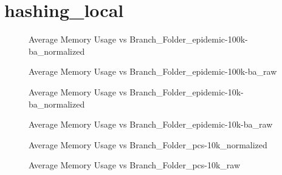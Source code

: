 \section{hashing\_local}
\begin{figure}[H]
\centering

\caption{Average Memory Usage vs Branch\_Folder\_epidemic-100k-ba\_normalized}
\end{figure}
\vspace{1cm}
\begin{figure}[H]
\centering

\caption{Average Memory Usage vs Branch\_Folder\_epidemic-100k-ba\_raw}
\end{figure}
\vspace{1cm}
\newpage
\begin{figure}[H]
\centering

\caption{Average Memory Usage vs Branch\_Folder\_epidemic-10k-ba\_normalized}
\end{figure}
\vspace{1cm}
\begin{figure}[H]
\centering

\caption{Average Memory Usage vs Branch\_Folder\_epidemic-10k-ba\_raw}
\end{figure}
\vspace{1cm}
\newpage
\begin{figure}[H]
\centering

\caption{Average Memory Usage vs Branch\_Folder\_pcs-10k\_normalized}
\end{figure}
\vspace{1cm}
\begin{figure}[H]
\centering

\caption{Average Memory Usage vs Branch\_Folder\_pcs-10k\_raw}
\end{figure}
